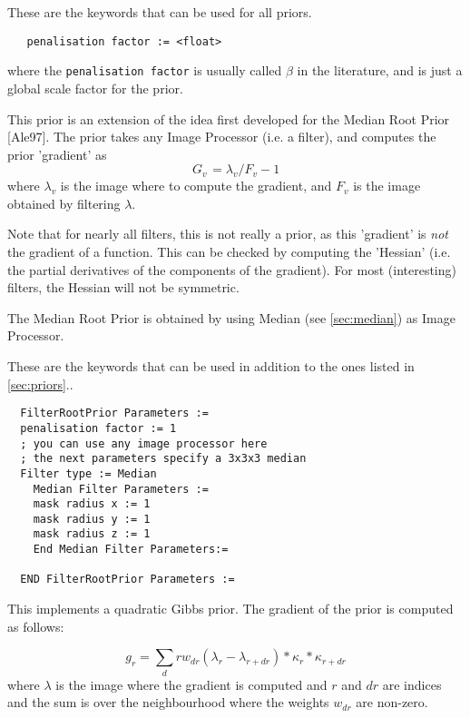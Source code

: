 \documentclass{article}
\begin{document}
{ 
}

These are the keywords that can be used for all priors.
  \begin{verbatim}
   penalisation factor := <float>
  \end{verbatim}
  \noindent where the \texttt{penalisation factor} is usually called
  $\beta$ in the literature, and is just a global scale factor for the
  prior.

{ 
}

This prior is an extension of the idea first developed for the 
Median Root Prior [Ale97]. The prior takes any Image Processor 
(i.e. a filter), and computes the prior 'gradient' as 
\[
G_{v\,} =\lambda _{v} /F_{v}  -1
\]
\noindent where 
$\lambda _{v} $
 is the image where to compute the gradient, and 
$F_{v} $ is the image obtained by filtering $\lambda $.

Note that for nearly all filters, this is not really a prior, as 
this 'gradient' is \textit{not} the gradient of a function. This can 
be checked by computing the 'Hessian' (i.e. the partial derivatives 
of the components of the gradient). For most (interesting) filters, 
the Hessian will not be symmetric.


The Median Root Prior is obtained by using Median (see \ref{sec:median}) 
as Image Processor.

{ 
}

These are the keywords that can be used in addition to the ones listed in \ref{sec:priors}..
  \begin{verbatim}
  FilterRootPrior Parameters :=
  penalisation factor := 1
  ; you can use any image processor here
  ; the next parameters specify a 3x3x3 median
  Filter type := Median
    Median Filter Parameters :=
    mask radius x := 1   
    mask radius y := 1
    mask radius z := 1
    End Median Filter Parameters:=

  END FilterRootPrior Parameters :=
 \end{verbatim}

{ 
}

This implements a quadratic Gibbs prior. The gradient of the prior is computed as follows:
  
 \[
  g_r = \sum_dr w_{dr} (\lambda_r - \lambda_{r+dr}) * \kappa_r * \kappa_{r+dr}
  \]
  \noindent where $\lambda$ is the image where the gradient is computed
   and $r$ and $dr$ are indices and the sum
  is over the neighbourhood where the weights $w_{dr}$ are non-zero.
\end{document}
